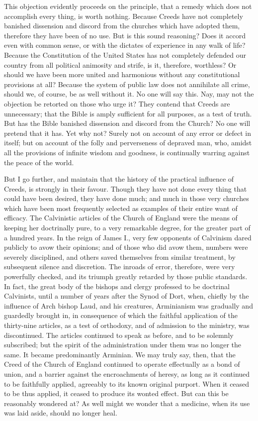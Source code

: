 \documentclass[
]{book}
\begin{document}
This objection evidently proceeds on the principle, that a remedy which does not accomplish every thing, is worth nothing. Because Creeds have not completely banished dissension and discord from the churches which have adopted them, therefore they have been of no use. But is this sound reasoning? Does it accord even with common sense, or with the dictates of experience in any walk of life? Because the Constitution of the United States has not completely defended our country from all political animosity and strife, is it, therefore, worthless? Or should we have been more united and harmonious without any constitutional provisions at all? Because the system of public law does not annihilate all crime, should we, of course, be as well without it. No one will say this. Nay, may not the objection be retorted on those who urge it? They contend that Creeds are unnecessary; that the Bible is amply sufficient for all purposes, as a test of truth. But has the Bible banished dissension and discord from the Church? No one will pretend that it has. Yet why not? Surely not on account of any error or defect in itself; but on account of the folly and perverseness of depraved man, who, amidst all the provisions of infinite wisdom and goodness, is continually warring against the peace of the world.

But I go further, and maintain that the history of the practical influence of Creeds, is strongly in their favour. Though they have not done every thing that could have been desired, they have done much; and much in those very churches which have been most frequently selected as examples of their entire want of efficacy. The Calvinistic articles of the Church of England were the means of keeping her doctrinally pure, to a very remarkable degree, for the greater part of a hundred years. In the reign of James I., very few opponents of Calvinism dared publicly to avow their opinions; and of those who did avow them, numbers were severely disciplined, and others saved themselves from similar treatment, by subsequent silence and discretion. The inroads of error, therefore, were very powerfully checked, and its triumph greatly retarded by those public standards. In fact, the great body of the bishops and clergy professed to be doctrinal Calvinists, until a number of years after the Synod of Dort, when, chiefly by the influence of Arch bishop Laud, and his creatures, Arminianism was gradually and guardedly brought in, in consequence of which the faithful application of the thirty-nine articles, as a test of orthodoxy, and of admission to the ministry, was discontinued. The articles continued to speak as before, and to be solemnly subscribed; but the spirit of the administration under them was no longer the same. It became predominantly Arminian. We may truly say, then, that the Creed of the Church of England continued to operate effectually as a bond of union, and a barrier against the encroachments of heresy, as long as it continued to be faithfully applied, agreeably to its known original purport. When it ceased to be thus applied, it ceased to produce its wonted effect. But can this be reasonably wondered at? As well might we wonder that a medicine, when its use was laid aside, should no longer heal.
\end{document}
